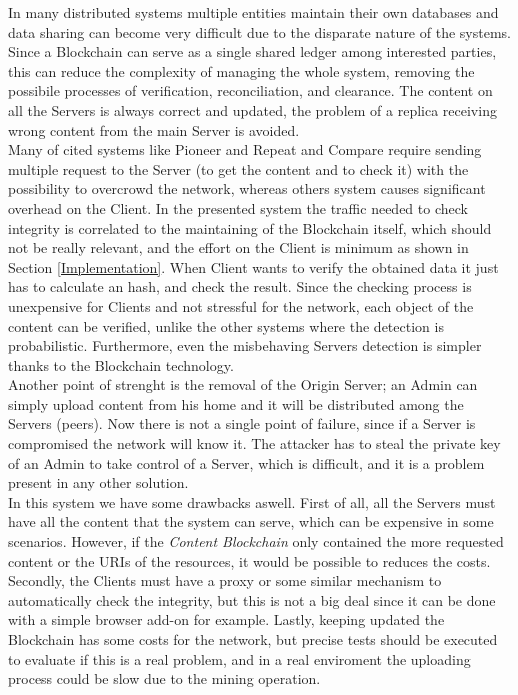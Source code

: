\documentclass[hidelinks,conference,compsoc]{IEEEtran}
\begin{document}
In many distributed systems multiple entities maintain their own databases and data sharing can become very difficult due to the disparate nature of the systems. Since a Blockchain can serve as a single shared ledger among interested parties, this can reduce the complexity of managing the whole system, removing the possibile processes of verification, reconciliation, and clearance. The content on all the Servers is always correct and updated, the problem of a replica receiving wrong content from the main Server is avoided.\\
Many of cited systems like Pioneer \cite{seshadri2005pioneer} and Repeat and Compare \cite{michalakis2007ensuring} require sending multiple request to the Server (to get the content and to check it) with the possibility to overcrowd the network, whereas others system causes significant overhead on the Client. In the presented system the traffic needed to check integrity is correlated to the maintaining of the Blockchain itself, which should not be really relevant, and the effort on the Client is minimum as shown in Section \ref{Implementation}. When Client wants to verify the obtained data it just has to calculate an hash, and check the result. Since the checking process is unexpensive for Clients and not stressful for the network, each object of the content can be verified, unlike the other systems where the detection is probabilistic. Furthermore, even the misbehaving Servers detection is simpler thanks to the Blockchain technology. 
\\
Another point of strenght is the removal of the Origin Server; an Admin can simply upload content from his home and it will be distributed among the Servers (peers). Now there is not a single point of failure, since if a Server is compromised the network will know it.  The attacker has to steal the private key of an Admin to take control of a Server, which is difficult, and it is a problem present in any other solution.
\\In this system we have some drawbacks aswell. First of all, all the Servers must have all the content that the system can serve, which can be expensive in some scenarios. However, if the \textit{Content Blockchain} only contained the more requested content or the URIs of the resources, it would be possible to reduces the costs. Secondly, the Clients must have a proxy or some similar mechanism to automatically check the integrity, but this is not a big deal since it can be done with a simple browser add-on for example. Lastly, keeping updated the Blockchain has some costs for the network, but precise tests should be executed to evaluate if this is a real problem, and in a real enviroment the uploading process could be slow due to the mining operation.
\end{document}
